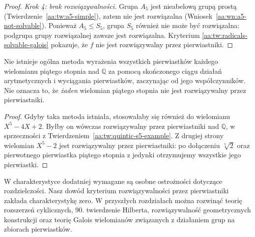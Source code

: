 \begin{proof}
\emph{Krok 4: brak rozwiązywalności.}
Grupa $A_5$ jest nieabelową grupą prostą
(Twierdzenie~\ref{aa:tw:a5-simple}), zatem nie jest
rozwiązalna (Wniosek~\ref{aa:wn:a5-not-solvable}).
Ponieważ $A_5\le S_5$, grupa $S_5$ również nie może
być rozwiązalna: podgrupa grupy rozwiązalnej
zawsze jest rozwiązalna. Kryterium
\ref{aa:tw:radicals-solvable-galois} pokazuje,
że $f$ nie jest rozwiązywalny przez pierwiastniki.
\end{proof}

\begin{wniosek}
\label{aa:wn:abel-ruffini}
Nie istnieje ogólna metoda wyrażenia wszystkich pierwiastków
każdego wielomianu piątego stopnia nad $\mathbb Q$
za pomocą skończonego ciągu działań arytmetycznych
i wyciągania pierwiastków, zaczynając od jego współczynników.
Nie oznacza to, że \emph{żaden} wielomian piątego stopnia
nie jest rozwiązywalny przez pierwiastniki.
\end{wniosek}
\begin{proof}
Gdyby taka metoda istniała, stosowałaby się również
do wielomianu $X^5-4X+2$. Byłby on wówczas
rozwiązywalny przez pierwiastniki nad $\mathbb Q$,
w sprzeczności z
Twierdzeniem~\ref{aa:tw:quintic-s5-example}.
Z drugiej strony wielomian $X^5-2$ jest rozwiązywalny
przez pierwiastniki: po dołączeniu $\sqrt[5]2$ oraz
pierwotnego pierwiastka piątego stopnia z jedynki
otrzymujemy wszystkie jego pierwiastki.
\end{proof}

\begin{uwaga}
\label{aa:uw:radicals-next}
W charakterystyce dodatniej wymagane są osobne
ostrożności dotyczące rozdzielczości. Nasz dowód
kryterium rozwiązywalności przez pierwiastniki zakłada
charakterystykę zero. W przyszłych rozdziałach można
rozwinąć teorię rozszerzeń cyklicznych, 90. twierdzenie Hilberta,
rozwiązywalność geometrycznych konstrukcji oraz teorię Galois
wielomianów związanych z działaniem grup na zbiorach pierwiastków.
\end{uwaga}